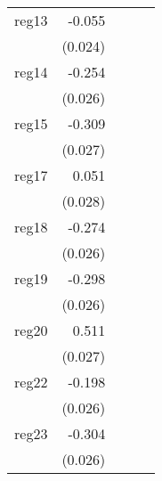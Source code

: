 {\begin{longtable}{l*{4}{D{.}{.}{-1}}}
\addlinespace
reg13       &      -0.055\sym{*}  &                     &                     &                     \\
            &     (0.024)         &                     &                     &                     \\
\addlinespace
reg14       &      -0.254\sym{***}&                     &                     &                     \\
            &     (0.026)         &                     &                     &                     \\
\addlinespace
reg15       &      -0.309\sym{***}&                     &                     &                     \\
            &     (0.027)         &                     &                     &                     \\
\addlinespace
reg17       &       0.051         &                     &                     &                     \\
            &     (0.028)         &                     &                     &                     \\
\addlinespace
reg18       &      -0.274\sym{***}&                     &                     &                     \\
            &     (0.026)         &                     &                     &                     \\
\addlinespace
reg19       &      -0.298\sym{***}&                     &                     &                     \\
            &     (0.026)         &                     &                     &                     \\
\addlinespace
reg20       &       0.511\sym{***}&                     &                     &                     \\
            &     (0.027)         &                     &                     &                     \\
\addlinespace
reg22       &      -0.198\sym{***}&                     &                     &                     \\
            &     (0.026)         &                     &                     &                     \\
\addlinespace
reg23       &      -0.304\sym{***}&                     &                     &                     \\
            &     (0.026)         &                     &                     &                     \\

\end{longtable}}
